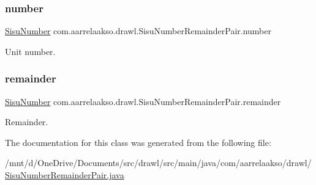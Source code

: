 \subsubsection{\texorpdfstring{number}{number}}
{\footnotesize\ttfamily \hyperlink{classcom_1_1aarrelaakso_1_1drawl_1_1_sisu_number}{Sisu\+Number} com.\+aarrelaakso.\+drawl.\+Sisu\+Number\+Remainder\+Pair.\+number\hspace{0.3cm}{\ttfamily [private]}}



Unit number. 

\mbox{\label{classcom_1_1aarrelaakso_1_1drawl_1_1_sisu_number_remainder_pair_a2db9bc3ff60d0078b3341f75dd830890}} 
\subsubsection{\texorpdfstring{remainder}{remainder}}
{\footnotesize\ttfamily \hyperlink{classcom_1_1aarrelaakso_1_1drawl_1_1_sisu_number}{Sisu\+Number} com.\+aarrelaakso.\+drawl.\+Sisu\+Number\+Remainder\+Pair.\+remainder\hspace{0.3cm}{\ttfamily [private]}}



Remainder. 



The documentation for this class was generated from the following file\+:\begin{DoxyCompactItemize}
\item 
/mnt/d/\+One\+Drive/\+Documents/src/drawl/src/main/java/com/aarrelaakso/drawl/\hyperlink{_sisu_number_remainder_pair_8java}{Sisu\+Number\+Remainder\+Pair.\+java}\end{DoxyCompactItemize}
